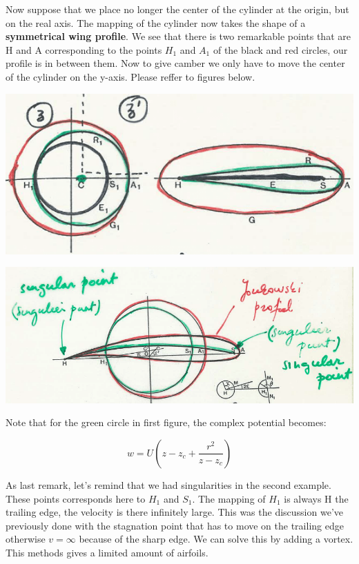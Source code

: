 \documentclass[british,french,11pt, a4paper, openany]{article}
\begin{document}
Now suppose that we place no longer the center of the cylinder at the origin, but on the real axis. The mapping of the cylinder now takes the shape of a \textbf{symmetrical wing profile}. We see that there is two remarkable points that are H and A corresponding to the points $H_1$ and $A_1$ of the black and red circles, our profile is in between them. Now to give camber we only have to move the center of the cylinder on the y-axis. Please reffer to figures below. 

\begin{center}
	\begin{minipage}{0.45\textwidth}
		\includegraphics[scale=0.3]{ch2/31}
	\end{minipage}
	\begin{minipage}{0.45\textwidth}
		\includegraphics[scale=0.2]{ch2/32}
	\end{minipage}
\end{center}

Note that for the green circle in first figure, the complex potential becomes:

\begin{equation}
w = U\left( z-z_c + \frac{r^2}{z-z_c} \right)
\end{equation}

As last remark, let's remind that we had singularities in the second example. These points corresponds here to $H_1$ and $S_1$. The mapping of $H_1$ is always H the trailing edge, the velocity is there infinitely large. This was the discussion we've previously done with the stagnation point that has to move on the trailing edge otherwise $v = \infty$ because of the sharp edge. We can solve this by adding a vortex. This methods gives a limited amount of airfoils.
\end{document}
